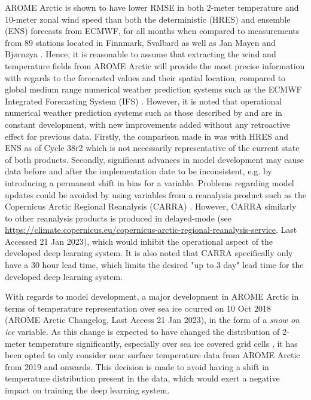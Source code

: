 \documentclass[../main/thesis.tex]{subfiles}
\begin{document}
AROME Arctic is shown to have lower RMSE in both 2-meter temperature and 10-meter zonal wind speed than both the deterministic (HRES) and ensemble (ENS) forecasts from ECMWF, for all months when compared to measurements from 89 stations located in Finnmark, Svalbard as well as Jan Mayen and Bjørnøya \citep{Mueller2017}. Hence, it is reasonable to assume that extracting the wind and temperature fields from AROME Arctic will provide the most precise information with regards to the forecasted values and their spatial location, compared to global medium range numerical weather prediction systems such as the ECMWF Integrated Forecasting System (IFS) \citep{Haiden2022}. However, it is noted that operational numerical weather prediction systems such as those described by \citet{Mueller2017} and \citet{Haiden2022} are in constant development, with new improvements added without any retroactive effect for previous data. Firstly, the comparison made in \citet{Mueller2017} was with HRES and ENS as of Cycle 38r2 \citep{Bauer2013} which is not necessarily representative of the current state of both products. Secondly, significant advances in model development may cause data before and after the implementation date to be inconsistent, e.g. by introducing a permanent shift in bias for a variable. Problems regarding model updates could be avoided by using variables from a reanalysis product such as the Copernicus Arctic Regional Reanalysis (CARRA) \citep{Koeltzow2022}. However, CARRA similarly to other reanalysis products is produced in delayed-mode (see \url{https://climate.copernicus.eu/copernicus-arctic-regional-reanalysis-service}, Last Accessed 21 Jan 2023), which would inhibit the operational aspect of the developed deep learning system. It is also noted that CARRA specifically only have a 30 hour lead time, which limits the desired "up to 3 day" lead time for the developed deep learning system.

With regards to model development, a major development in AROME Arctic in terms of temperature representation over sea ice ocurred on 10 Oct 2018 (AROME Arctic Changelog, Last Access 21 Jan 2023), in the form of a \textit{snow on ice} variable. As this change is expected to have changed the distribution of 2-meter temperature significantly, especially over sea ice covered grid cells \citep{Batrak2019}, it has been opted to only consider near surface temperature data from AROME Arctic from 2019 and onwards. This decision is made to avoid having a shift in temperature distribution present in the data, which would exert a negative impact on training the deep learning system.
\end{document}
